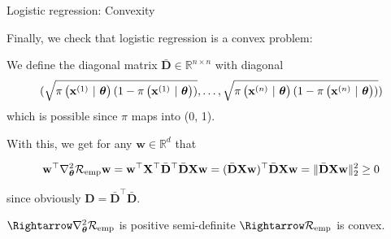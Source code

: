 \documentclass[11pt,compress,t,notes=noshow, xcolor=table]{beamer}
\begin{document}
\begin{framei}{Logistic regression: Convexity}

\item  Finally, we check that logistic regression is a convex problem:

\item We define the diagonal matrix $\bar{\mathbf{D}} \in \mathbb{R}^{n \times n}$ with diagonal 
$$(\sqrt{\pixit[1](1-\pixit[1])}, \dots, \sqrt{\pixit[n](1-\pixit[n])}) $$
which is possible since $\pi$ maps into (0, 1). \\

\item With this, we get for any $\mathbf{w} \in \mathbb{R}^d$ that

$$\mathbf{w}^\top  \nabla^2_{\thetav}\riske \mathbf{w} =   \mathbf{w}^\top  \mathbf{X}^\top \bar{\mathbf{D}}^\top \bar{\mathbf{D}}\mathbf{X} \mathbf{w} = (\bar{\mathbf{D}}\mathbf{X} \mathbf{w})^\top\bar{\mathbf{D}}\mathbf{X} \mathbf{w} = \Vert \bar{\mathbf{D}}\mathbf{X} \mathbf{w} \Vert^2_2 \geq 0$$

since obviously $\mathbf{D} = \bar{\mathbf{D}}^\top \bar{\mathbf{D}}.$ \\

\item $\Rightarrow \nabla^2_{\thetav}\riske$ is positive semi-definite $\Rightarrow \riske$ is convex.

\end{framei}

\endlecture
\end{document}
